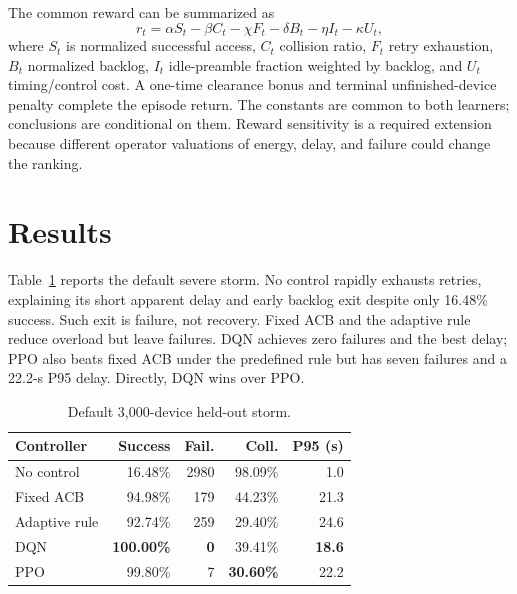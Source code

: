 \documentclass[conference]{IEEEtran}
\begin{document}
The common reward can be summarized as
\begin{equation}
r_t = \alpha S_t-\beta C_t-\chi F_t-\delta B_t-\eta I_t-\kappa U_t,
\end{equation}
where $S_t$ is normalized successful access, $C_t$ collision ratio, $F_t$ retry exhaustion, $B_t$ normalized backlog, $I_t$ idle-preamble fraction weighted by backlog, and $U_t$ timing/control cost. A one-time clearance bonus and terminal unfinished-device penalty complete the episode return. The constants are common to both learners; conclusions are conditional on them. Reward sensitivity is a required extension because different operator valuations of energy, delay, and failure could change the ranking.

\section{Results}
Table~\ref{tab:default} reports the default severe storm. No control rapidly exhausts retries, explaining its short apparent delay and early backlog exit despite only 16.48\% success. Such exit is failure, not recovery. Fixed ACB and the adaptive rule reduce overload but leave failures. DQN achieves zero failures and the best delay; PPO also beats fixed ACB under the predefined rule but has seven failures and a 22.2-s P95 delay. Directly, DQN wins over PPO.

\begin{table}[t]
\caption{Default 3,000-device held-out storm.}
\label{tab:default}
\centering\small
\begin{tabular}{lrrrr}
\toprule
Controller & Success & Fail. & Coll. & P95 (s)\\
\midrule
No control & 16.48\% & 2980 & 98.09\% & 1.0\\
Fixed ACB & 94.98\% & 179 & 44.23\% & 21.3\\
Adaptive rule & 92.74\% & 259 & 29.40\% & 24.6\\
DQN & \textbf{100.00\%} & \textbf{0} & 39.41\% & \textbf{18.6}\\
PPO & 99.80\% & 7 & \textbf{30.60\%} & 22.2\\
\bottomrule
\end{tabular}
\end{table}
\end{document}
